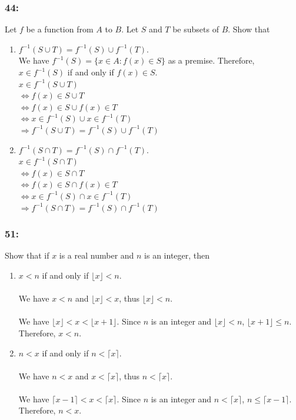 \documentclass[12pt,en,a4paper]{article}
\begin{document}
	\subsubsection*{44:}
	Let $f$ be a function from $A$ to $B$. Let $S$ and $T$ be subsets of $B$. Show that
	\begin{enumerate}[label=\textbf{\alph*)}]
		\item $f^{-1}(S\cup T)=f^{-1}(S)\cup f^{-1}(T)$.\\
		
		We have $f^{-1}(S)=\{x\in A:f(x)\in S\}$ as a premise. Therefore, $x\in f^{-1}(S)$ if and only if $f(x)\in S$.\\
		
		$x\in f^{-1}(S\cup T)$\\
		$\Leftrightarrow f(x)\in S\cup T$\\
		$\Leftrightarrow f(x)\in S\cup f(x)\in T$\\
		$\Leftrightarrow x\in f^{-1}(S)\cup x\in f^{-1}(T)$\\
		$\Rightarrow f^{-1}(S\cup T)=f^{-1}(S)\cup f^{-1}(T)$
		\item $f^{-1}(S\cap T)=f^{-1}(S)\cap f^{-1}(T)$.\\
		
		$x\in f^{-1}(S\cap T)$\\
		$\Leftrightarrow f(x)\in S\cap T$\\
		$\Leftrightarrow f(x)\in S\cap f(x)\in T$\\
		$\Leftrightarrow x\in f^{-1}(S)\cap x\in f^{-1}(T)$\\
		$\Rightarrow f^{-1}(S\cap T)=f^{-1}(S)\cap f^{-1}(T)$
	\end{enumerate}
	\subsubsection*{51:}
	Show that if $x$ is a real number and $n$ is an integer, then
	\begin{enumerate}[label=\textbf{\alph*)}]
		\item $x<n$ if and only if $\lfloor x\rfloor <n$.\\\\
		We have $x<n$ and $\lfloor x\rfloor<x$, thus $\lfloor x\rfloor<n$.\\\\
		We have $\lfloor x\rfloor<x<\lfloor x+1\rfloor$. Since $n$ is an integer and $\lfloor x\rfloor<n$, $\lfloor x+1\rfloor\leq n$.\\
		Therefore, $x<n$.
		\item $n<x$ if and only if $n<\lceil x\rceil$.\\\\
		We have $n<x$ and $x<\lceil x\rceil$, thus $n<\lceil x\rceil$.\\\\
		We have $\lceil x-1\rceil<x<\lceil x\rceil$. Since $n$ is an integer and $n<\lceil x\rceil$, $n\leq\lceil x-1\rceil$.\\
		Therefore, $n<x$.
	\end{enumerate}
\end{document}
